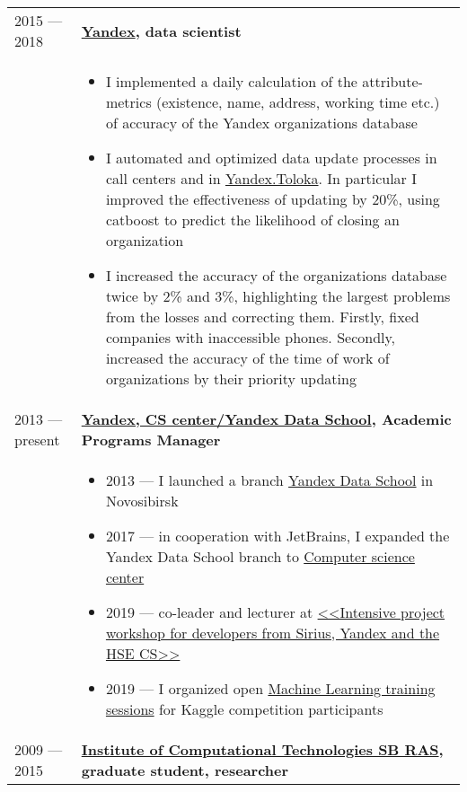 \documentclass[11pt]{article}
\begin{document}
\begin{longtable} {l | p{}}

2015 — 2018 & {\textbf{\href{https://yandex.ru/}{Yandex}, data scientist}} \\
& \vspace{-1.5em} \begin{itemize}
	\item I implemented a daily calculation of the attribute-metrics (existence, name, address, working time etc.) of accuracy of the Yandex organizations database
	\item I automated and optimized data update processes in call centers and in \href{https://toloka.yandex.ru}{Yandex.Toloka}. In particular I improved the effectiveness of updating by 20\%, using catboost to predict the likelihood of closing an organization
	\item I increased the accuracy of the organizations database twice by 2\% and 3\%, highlighting the largest problems from the losses and correcting them. Firstly, fixed companies with inaccessible phones. Secondly, increased the accuracy of the time of work of organizations by their priority updating
\end{itemize}
\\
2013 — present & {\textbf{\href{https://compscicenter.ru}{Yandex, CS center/Yandex Data School}, Academic Programs Manager}} \\
& \vspace{-1.5em} \begin{itemize}
	\item 2013 — I launched a branch \href{https://yandexdataschool.ru}{Yandex Data School} in Novosibirsk
	\item 2017 — in cooperation with JetBrains, I expanded the Yandex Data School branch to \href{https://compscicenter.ru}{Computer science center}
	\item 2019 — co-leader and lecturer at \href{https://sochisirius.ru/obuchenie/graduates/smena240/1174}{<<Intensive project workshop for developers from Sirius, Yandex and the HSE CS>>}
	\item 2019 — I organized open \href{https://habr.com/ru/company/JetBrains-education/blog/458042/}{Machine Learning training sessions} for Kaggle competition participants
\end{itemize}
\\
2009 — 2015 & {\textbf{\href{http://www.ict.nsc.ru}{Institute of Computational Technologies SB RAS}, graduate student, researcher}}\\

\end{longtable}
\end{document}
